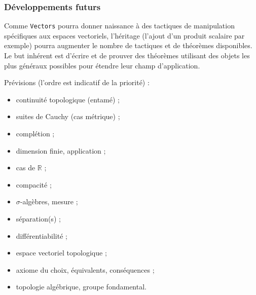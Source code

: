 \documentclass{article}
\newcommand{\coqcode}[1]{\texttt{#1}}
\begin{document}
\subsubsection{Développements futurs}

Comme \coqcode{Vectors} pourra donner naissance à des tactiques de manipulation spécifiques aux espaces vectoriels, l'héritage (l'ajout d'un produit scalaire par exemple) pourra augmenter le nombre de tactiques et de théorèmes disponibles. Le but inhérent est d'écrire et de prouver des théorèmes utilisant des objets les plus généraux possibles pour étendre leur champ d'application.

Prévisions (l'ordre est indicatif de la priorité) :
\begin{itemize}
  \item continuité topologique (entamé) ;
  \item suites de Cauchy (cas métrique) ;
  \item complétion ;
  \item dimension finie, application ;
  \item cas de $\mathbb{R}$ ;
  \item compacité ;
  \item $\sigma$-algèbres, mesure ;
  \item séparation(s) ;
  \item différentiabilité ;
  \item espace vectoriel topologique ;
  \item axiome du choix, équivalents, conséquences ;
  \item topologie algébrique, groupe fondamental.
\end{itemize}
\end{document}
